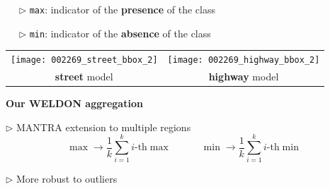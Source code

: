 \documentclass[landscape,a0paper,fontscale=0.292]{baposter}
\begin{document}
\begin{poster}
{~~ $\triangleright$ \texttt{max}: indicator of the \textbf{presence} of the class

~~ $\triangleright$ \texttt{min}: indicator of the \textbf{absence} of the class


\vspace{-2mm}

\begin{center}
 \begin{tabular}{cc}
\texttt{[image: 002269\_street\_bbox\_2]}
& 
\texttt{[image: 002269\_highway\_bbox\_2]}
\\
\textbf{street} model & \textbf{highway} model
\end{tabular}
\end{center}


\textbf{Our WELDON aggregation} 

$\triangleright$ MANTRA extension to multiple regions
%
\vspace{-2.5mm}
\begin{equation*}
 \max \rightarrow \frac{1}{k} \sum_{i=1}^k i\text{-th} \max \quad\quad\quad
 \min \rightarrow \frac{1}{k} \sum_{i=1}^k i\text{-th} \min
\end{equation*}

\vspace{-3mm}
$\triangleright$ More robust to outliers

}


\end{poster}
\end{document}
